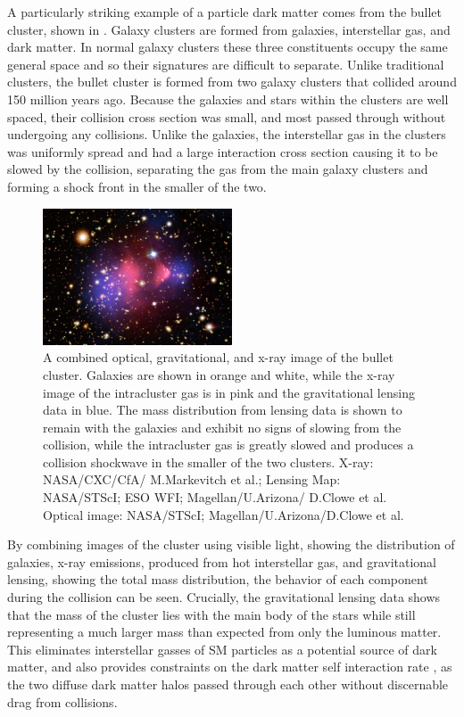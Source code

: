 A particularly striking example of a particle dark matter comes from the bullet cluster, shown in . 
Galaxy clusters are formed from galaxies, interstellar gas, and dark matter.
In normal galaxy clusters these three constituents occupy the same general space and so their signatures are difficult to separate.
Unlike traditional clusters, the bullet cluster is formed from two galaxy clusters that collided around 150 million years ago. 
Because the galaxies and stars within the clusters are well spaced, their collision cross section was small, and most passed through without undergoing any collisions.
Unlike the galaxies, the interstellar gas in the clusters was uniformly spread and had a large interaction cross section causing it to be slowed by the collision, separating the gas from the main galaxy clusters and forming a shock front in the smaller of the two.

\begin{figure}[htpb]
	\label{fig:bullet}
	\centering
	\includegraphics[width=0.5\textwidth]{figures/bullet_cluster.jpg}
	\caption[Visible, x-ray, and gravitational lensing images of the bullet cluster]{ A combined optical, gravitational, and x-ray image of the bullet cluster. Galaxies are shown in orange and white, while the x-ray image of the intracluster gas is in pink and the gravitational lensing data in blue. The mass distribution from lensing data is shown to remain with the galaxies and exhibit no signs of slowing from the collision, while the intracluster gas is greatly slowed and produces a collision shockwave in the smaller of the two clusters. X-ray: NASA/CXC/CfA/ M.Markevitch et al.; Lensing Map: NASA/STScI; ESO WFI; Magellan/U.Arizona/ D.Clowe et al. Optical image: NASA/STScI; Magellan/U.Arizona/D.Clowe et al.}
\end{figure}

By combining images of the cluster using visible light, showing the distribution of galaxies, x-ray emissions, produced from hot interstellar gas, and gravitational lensing, showing the total mass distribution, the behavior of each component during the collision can be seen. 
Crucially, the gravitational lensing data shows that the mass of the cluster lies with the main body of the stars while still representing a much larger mass than expected from only the luminous matter. 
This eliminates interstellar gasses of SM particles as a potential source of dark matter, and also provides constraints on the dark matter self interaction rate \cite{Randall_2008}, as the two diffuse dark matter halos passed through each other without discernable drag from collisions.

